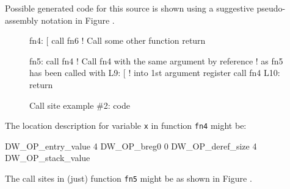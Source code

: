 \clearpage
Possible generated code for this source is shown using a suggestive 
pseudo-\linebreak[0]assembly notation in Figure .
\par %
\begin{figure}[ht]
\begin{nlnlisting}

fn4:
    [%
    call fn6          ! Call some other function
    return

fn5:
    call fn4          ! Call fn4 with the same argument by reference 
                      !   as fn5 has been called with
L9:
    [%
                      !   into 1st argument register
    call fn4
L10:
    return
    
\end{nlnlisting}
\caption{Call site example \#2: code}
\label{fig:callsiteexample2code}
\end{figure}

The location description for variable \texttt{x} in function 
\texttt{fn4} might be:
\par %
\vspace{3mm}
\begin{nlnlisting}
    DW_OP_entry_value 4 DW_OP_breg0 0 DW_OP_deref_size 4 DW_OP_stack_value
\end{nlnlisting}

The call sites in (just) function \texttt{fn5} might be as shown in 
Figure .

